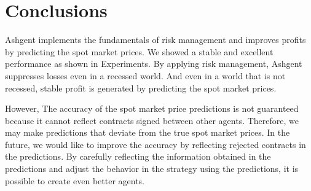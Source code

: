 \documentclass[10pt]{article}
\begin{document}
\section*{Conclusions}
Ashgent implements the fundamentals of risk management and improves profits by predicting the spot market prices.
We showed a stable and excellent performance as shown in Experiments.
By applying risk management, Ashgent suppresses losses even in a recessed world.
And even in a world that is not recessed, stable profit is generated by predicting the spot market prices.



However, The accuracy of the spot market price predictions is not guaranteed because it cannot reflect contracts signed between other agents.
Therefore, we may make predictions that deviate from the true spot market prices.
In the future, we would like to improve the accuracy by reflecting rejected contracts in the predictions.
By carefully reflecting the information obtained in the predictions and adjust the behavior in the strategy using the predictions, it is possible to create even better agents.
\end{document}
